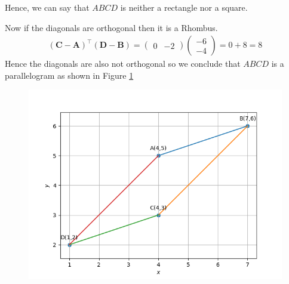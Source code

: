 \documentclass[12pt]{article}
\newcommand{\myvec}[1]{\ensuremath{\begin{pmatrix}#1\end{pmatrix}}}
\let\vec\mathbf
\begin{document}
\begin{enumerate}
	Hence, we can say that $ABCD$ is neither a rectangle nor a square.

	Now if the diagonals are orthogonal then it is a Rhombus.
	\begin{align}
		(\vec{C}- \vec{A})^\top (\vec{D}-\vec{B}) = \myvec{0&-2} \myvec{-6\\-4} = 0+8 = 8
	\end{align}
	Hence the diagonals are also not orthogonal so we conclude that $ABCD$ is a parallelogram as shown in Figure \ref{fig:Fig3}

\begin{figure}[!h]
	\begin{center} 
	    \includegraphics[width=\columnwidth]{figs/quad3}
	\end{center}
\caption{}
\label{fig:Fig3}
\end{figure}
\end{enumerate}
\end{document}
